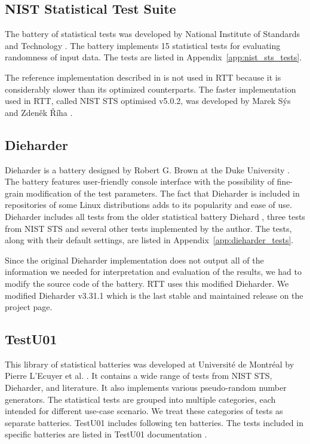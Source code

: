 \documentclass[
	digital,    %
	oneside,    %
	color,
	11pt,
	nocover,
	notable,
	nolof,
	nolot,
]{fithesis3}
\theoremstyle{definition}
\theoremstyle{remark}
\begin{document}
\subsection{NIST Statistical Test Suite}
The battery of statistical tests was developed by National Institute of Standards and Technology \cite{nist-sts}. The battery implements 15 statistical tests for evaluating randomness of input data. The tests are listed in Appendix~\ref{app:nist_sts_tests}.

The reference implementation described in \cite{nist-sts-documentation} is not used in RTT because it is considerably slower than its optimized counterparts. The faster implementation used in RTT, called NIST STS optimised v5.0.2, was developed by Marek Sýs and Zdeněk Říha \cite{nist-sts-syso-optimization}.

\subsection{Dieharder}
Dieharder is a battery designed by Robert G. Brown at the Duke University \cite{dieharder}. The battery features user-friendly console interface with the possibility of fine-grain modification of the test parameters. The fact that Dieharder is included in repositories of some Linux distributions \cite{dieharder-manpage} adds to its popularity and ease of use. Dieharder includes all tests from the older statistical battery Diehard \cite{diehard}, three tests from NIST STS and several other tests implemented by the author. The tests, along with their default settings, are listed in Appendix~\ref{app:dieharder_tests}.

Since the original Dieharder implementation does not output all of the information we needed for interpretation and evaluation of the results, we had to modify the source code of the battery. RTT uses this modified Dieharder. We modified Dieharder v3.31.1 which is the last stable and maintained release on the project page.

\subsection{TestU01}
This library of statistical batteries was developed at Université de Montréal by Pierre L’Ecuyer et al. \cite{testu01-paper}. It contains a wide range of tests from NIST STS, Dieharder, and literature. It also implements various pseudo-random number generators. The statistical tests are grouped into multiple categories, each intended for different use-case scenario. We treat these categories of tests as separate batteries. TestU01 includes following ten batteries. The tests included in specific batteries are listed in TestU01 documentation \cite{testu01-documentation}.
\end{document}
